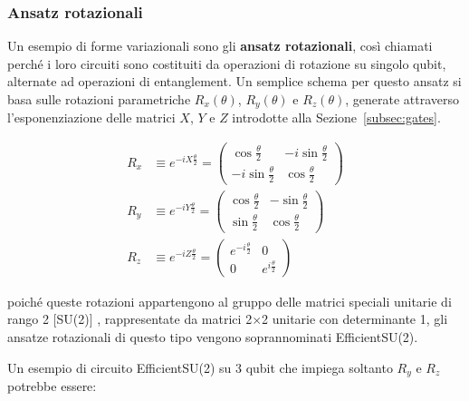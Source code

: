 \subsubsection{Ansatz rotazionali \cite{qiskit_TwoLocal}}

Un esempio di forme variazionali  sono gli \textbf{ansatz rotazionali}, così chiamati perché i loro circuiti sono costituiti da operazioni di rotazione su singolo qubit, alternate ad operazioni di entanglement. 
Un semplice schema per questo ansatz si basa sulle rotazioni parametriche $R_x(\theta)$, $R_y(\theta)$ e $R_z(\theta)$, generate attraverso l'esponenziazione delle matrici $X$, $Y$ e $Z$ introdotte alla Sezione~\ref{subsec:gates}.

\begin{subequations}\label{eqn:rotazioni-parametriche}
\begin{align}
    R_x &\equiv e^{-iX\frac{\theta}{2}} = 
    \begin{pmatrix}
        \cos\frac{\theta}{2}   &-i\sin\frac{\theta}{2}\\
        -i\sin\frac{\theta}{2} &\cos\frac{\theta}{2}
    \end{pmatrix}\\
    R_y &\equiv e^{-iY\frac{\theta}{2}} = 
    \begin{pmatrix}
        \cos\frac{\theta}{2} &-\sin\frac{\theta}{2}\\
        \sin\frac{\theta}{2} &\cos\frac{\theta}{2}
    \end{pmatrix}\\
    R_z &\equiv e^{-iZ\frac{\theta}{2}} = 
    \begin{pmatrix}
        e^{-i\frac{\theta}{2}} &0\\
        0  &e^{i\frac{\theta}{2}}
    \end{pmatrix}
\end{align}
\end{subequations}

poiché queste rotazioni appartengono al gruppo delle matrici speciali unitarie di rango 2 [SU(2)] \cite{McMillan_2019}, rappresentate da matrici 2$\times$2 unitarie con determinante 1, gli ansatze rotazionali di questo tipo vengono soprannominati EfficientSU(2).  

Un esempio di circuito EfficientSU(2) su 3 qubit che impiega soltanto $R_y$ e $R_z$ potrebbe essere:

